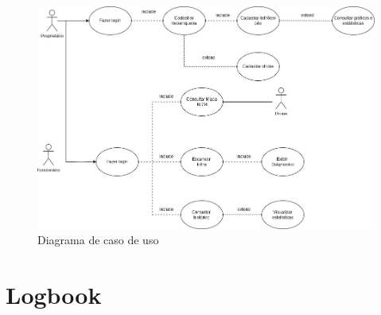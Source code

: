 \documentclass[
    a4paper,%
    12pt,%
    english,%
    brazilian,%
]{article}
\begin{document}
            \begin{figure}[h]
\centering
\caption{Diagrama de caso de uso}%
\label{fig:caso-uso}
\includegraphics[width=1.1\textwidth]{Logos/CasoUso.jpeg}
\end{figure}

\section*{Logbook}
\end{document}
